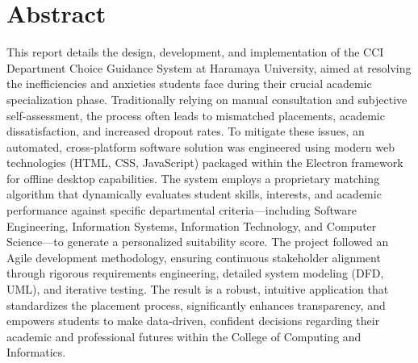 \documentclass[12pt, a4paper]{article}
\renewcommand{\headrulewidth}{0pt}
\renewcommand{\footrulewidth}{0pt}
\begin{document}
\clearpage


\newpage
\section*{Abstract}
This report details the design, development, and implementation of the CCI Department Choice Guidance System at Haramaya University, aimed at resolving the inefficiencies and anxieties students face during their crucial academic specialization phase. Traditionally relying on manual consultation and subjective self-assessment, the process often leads to mismatched placements, academic dissatisfaction, and increased dropout rates. To mitigate these issues, an automated, cross-platform software solution was engineered using modern web technologies (HTML, CSS, JavaScript) packaged within the Electron framework for offline desktop capabilities. The system employs a proprietary matching algorithm that dynamically evaluates student skills, interests, and academic performance against specific departmental criteria—including Software Engineering, Information Systems, Information Technology, and Computer Science—to generate a personalized suitability score. The project followed an Agile development methodology, ensuring continuous stakeholder alignment through rigorous requirements engineering, detailed system modeling (DFD, UML), and iterative testing. The result is a robust, intuitive application that standardizes the placement process, significantly enhances transparency, and empowers students to make data-driven, confident decisions regarding their academic and professional futures within the College of Computing and Informatics.
\newpage

\clearpage

\setcounter{page}{1}
\pagestyle{fancy}
\fancyhf{}
\fancyhead[R]{\thepage}
\renewcommand{\headrulewidth}{0pt}
\renewcommand{\footrulewidth}{0pt}
\fancypagestyle{plain}{
    \fancyhf{}
    \fancyhead[R]{\thepage}
    \renewcommand{\headrulewidth}{0pt}
    \renewcommand{\footrulewidth}{0pt}
}
\end{document}
